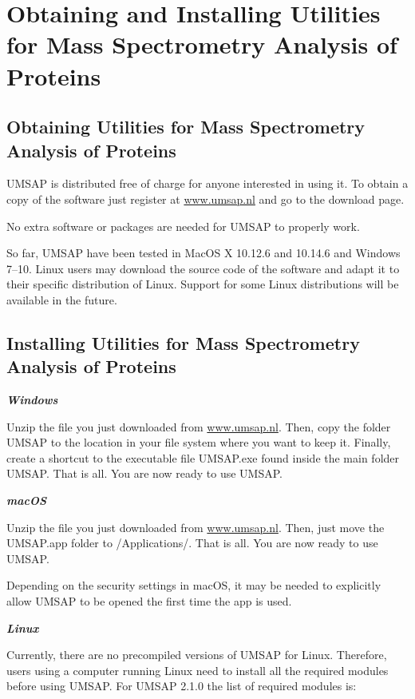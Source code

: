 \chapter{Obtaining and Installing Utilities for Mass Spectrometry Analysis of Proteins}

\section{Obtaining Utilities for Mass Spectrometry Analysis of Proteins}

UMSAP is distributed free of charge for anyone interested in using it. To obtain a copy of the software just register at \href{https://www.umsap.nl}{www.umsap.nl} and go to the download page.

No extra software or packages are needed for UMSAP to properly work.

So far, UMSAP have been tested in MacOS X \num[parse-numbers=false]{10.12.6} and \num[parse-numbers=false]{10.14.6} and Windows \numrange[range-phrase = /]{7}{10}. Linux users may download the source code of the software and adapt it to their specific distribution of Linux. Support for some Linux distributions will be available in the future. 

\section{Installing Utilities for Mass Spectrometry Analysis of Proteins}

\textit{\textbf{Windows}}

Unzip the file you just downloaded from \href{https://www.umsap.nl}{www.umsap.nl}. Then, copy the folder UMSAP to the location in your file system where you want to keep it. Finally, create a shortcut to the executable file UMSAP.exe found inside the main folder UMSAP. That is all. You are now ready to use UMSAP.

\textit{\textbf{macOS}}

Unzip the file you just downloaded from \href{https://www.umsap.nl}{www.umsap.nl}. Then, just move the UMSAP.app folder to /Applications/. That is all. You are now ready to use UMSAP. 

Depending on the security settings in macOS, it may be needed to explicitly allow UMSAP to be opened the first time the app is used.

\textit{\textbf{Linux}}

Currently, there are no precompiled versions of UMSAP for Linux. Therefore, users using a computer running Linux need to install all the required modules before using UMSAP. For UMSAP \num[parse-numbers=false]{2.1.0} the list of required modules is:

